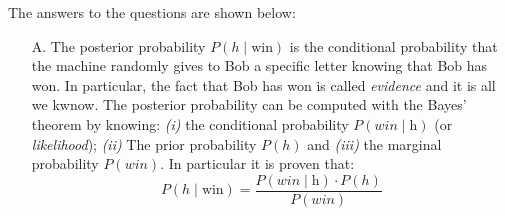 The answers to the questions are shown below:
\begin{itemize}
    \item[A.] The posterior probability $P(h\;|\;\text{win})$ is the conditional probability that the machine randomly gives to Bob
        a specific letter knowing that Bob has won. In particular, the fact that Bob has won is called \textit{evidence} and it is all
        we kwnow. The posterior probability can be computed with the Bayes' theorem by knowing: \textit{(i)} the conditional 
        probability $P(win\;|\;\text{h})$ (or \textit{likelihood}); \textit{(ii)} The prior probability $P(h)$ and 
        \textit{(iii)} the marginal probability $P(win)$.
        In particular it is proven that:
        \[ P(h\;|\;\text{win}) = \frac{P(win\;|\;\text{h}) \cdot P(h)}{P(win)}\]
    

\end{itemize}
